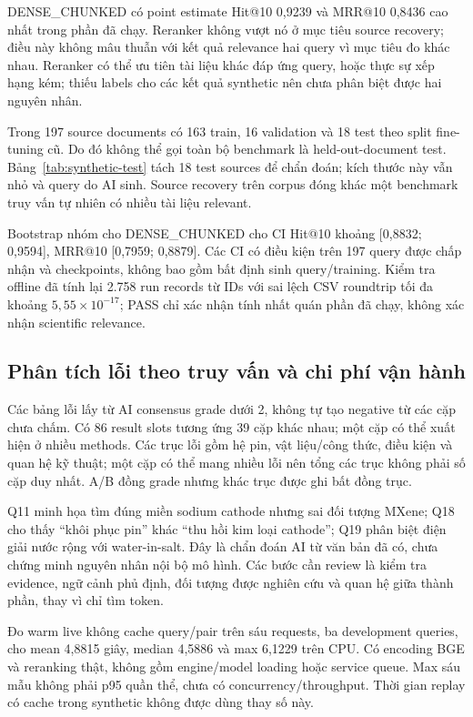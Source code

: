 DENSE\_CHUNKED có point estimate Hit@10 0,9239 và MRR@10 0,8436 cao nhất trong phần đã chạy. Reranker không vượt nó ở mục tiêu source recovery; điều này không mâu thuẫn với kết quả relevance hai query vì mục tiêu đo khác nhau. Reranker có thể ưu tiên tài liệu khác đáp ứng query, hoặc thực sự xếp hạng kém; thiếu labels cho các kết quả synthetic nên chưa phân biệt được hai nguyên nhân.

Trong 197 source documents có 163 train, 16 validation và 18 test theo split fine-tuning cũ. Do đó không thể gọi toàn bộ benchmark là held-out-document test. Bảng~\ref{tab:synthetic-test} tách 18 test sources để chẩn đoán; kích thước này vẫn nhỏ và query do AI sinh. Source recovery trên corpus đóng khác một benchmark truy vấn tự nhiên có nhiều tài liệu relevant.


Bootstrap nhóm cho DENSE\_CHUNKED cho CI Hit@10 khoảng [0,8832; 0,9594], MRR@10 [0,7959; 0,8879]. Các CI có điều kiện trên 197 query được chấp nhận và checkpoints, không bao gồm bất định sinh query/training. Kiểm tra offline đã tính lại 2.758 run records từ IDs với sai lệch CSV roundtrip tối đa khoảng $5,55\times10^{-17}$; PASS chỉ xác nhận tính nhất quán phần đã chạy, không xác nhận scientific relevance.

\subsection{Phân tích lỗi theo truy vấn và chi phí vận hành}


Các bảng lỗi lấy từ AI consensus grade dưới 2, không tự tạo negative từ các cặp chưa chấm. Có 86 result slots tương ứng 39 cặp khác nhau; một cặp có thể xuất hiện ở nhiều methods. Các trục lỗi gồm hệ pin, vật liệu/công thức, điều kiện và quan hệ kỹ thuật; một cặp có thể mang nhiều lỗi nên tổng các trục không phải số cặp duy nhất. A/B đồng grade nhưng khác trục được ghi bất đồng trục.

Q11 minh họa tìm đúng miền sodium cathode nhưng sai đối tượng MXene; Q18 cho thấy ``khôi phục pin'' khác ``thu hồi kim loại cathode''; Q19 phân biệt điện giải nước rộng với water-in-salt. Đây là chẩn đoán AI từ văn bản đã có, chưa chứng minh nguyên nhân nội bộ mô hình. Các bước cần review là kiểm tra evidence, ngữ cảnh phủ định, đối tượng được nghiên cứu và quan hệ giữa thành phần, thay vì chỉ tìm token.

Đo warm live không cache query/pair trên sáu requests, ba development queries, cho mean 4,8815 giây, median 4,5886 và max 6,1229 trên CPU. Có encoding BGE và reranking thật, không gồm engine/model loading hoặc service queue. Max sáu mẫu không phải p95 quần thể, chưa có concurrency/throughput. Thời gian replay có cache trong synthetic không được dùng thay số này.

